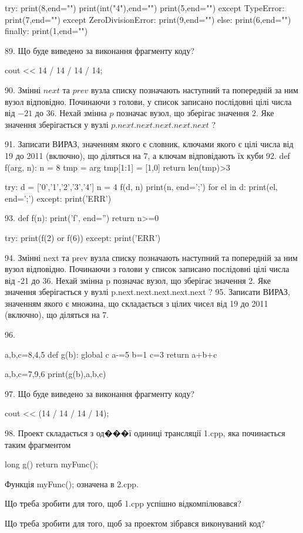 \documentclass[11pt]{article}
\begin{document}
{try:
    print(8,end="")
    print(int("4"),end="")
    print(5,end="")
except TypeError: print(7,end="")
except ZeroDivisionError: print(9,end="")
else: print(6,end="")
finally: print(1,end="")

89. Що буде виведено за виконання фрагменту коду?

cout << 14 / 14 / 14 / 14;

90. 
Змінні $next$ та $prev$ вузла списку позначають наступний та попередній за ним вузол відповідно. Починаючи з голови, у список записано послідовні цілі числа від $-21$ до $36$. Нехай змінна $p$ позначає вузол, що зберігає значення $2$.
Яке значення зберігається у вузлі $p.next.next.next.next.next$ ?

91. 
Записати ВИРАЗ, значенням якого є словник, ключами якого є цілі числа від 19 до 2011 (включно), що діляться на 7, а ключам відповідають їх куби 
92. 
def f(arg, n):
    n = 8
    tmp = arg
    tmp[1:1] = [1,0]
    return len(tmp)>3

try:
    d = ['0','1','2','3','4']
    n = 4
    f(d, n)
    print(n, end=';')
    for el in d:
        print(el, end=';')
except:
    print('ERR')

93. 
def f(n):
    print('f', end='')
    return n>=0

try:
    print(f(2) or f(6))
except:
    print('ERR')

94. 
Змінні next та prev вузла списку позначають наступний та попередній за ним вузол відповідно. Починаючи з голови у список записано послідовні цілі числа від -21 до 36. Нехай змінна p позначає вузол, що зберігає значення 2.
Яке значення зберігається у вузлі p.next.next.next.next.next ?
95. 
Записати ВИРАЗ, значенням якого є множина, що складається з цілих чисел від 19 до 2011 (включно), що діляться на 7.

96. 

a,b,c=8,4,5
def g(b):
global c    a-=5
    b=1
    c=3
    return a+b+c

a,b,c=7,9,6
print(g(b),a,b,c)

97. Що буде виведено за виконання фрагменту коду?

cout << (14 / 14 / 14 / 14);

98. 
Проект складається з од���ї одиниці трансляції 1.cpp, яка починається таким фрагментом\par
long g(){ return myFunc();}\par
Функція myFunc(); означена в 2.cpp.\par
Що треба зробити для того, щоб 1.cpp успішно відкомпілювався?\par\vspace{1.5cm}
Що треба зробити для того, щоб за проектом зібрався виконуваний код?\par

}
\end{document}
